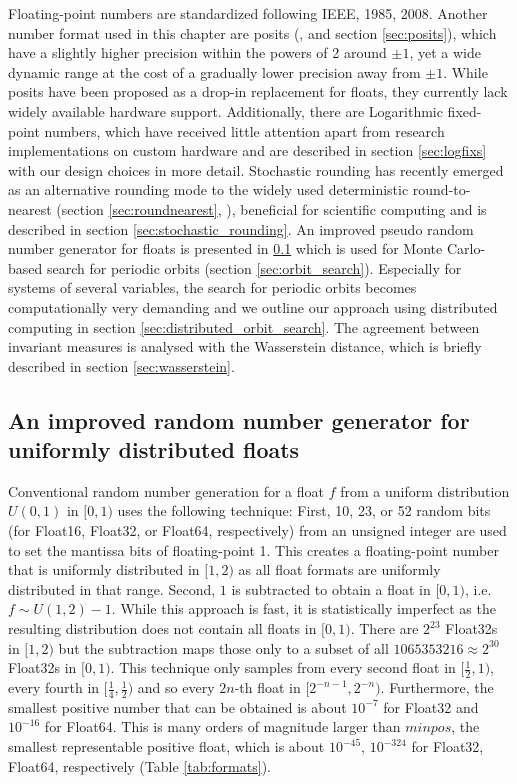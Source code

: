 Floating-point numbers are standardized following IEEE, 1985, 2008. Another number format used in this chapter are posits
(\cite{Gustafson2017a}, and section \ref{sec:posits}), which have a slightly higher precision within the powers of 2
around $\pm1$, yet a wide dynamic range at the cost of a gradually lower precision away from $\pm1$. While posits
have been proposed as a drop-in replacement for floats, they currently lack widely available hardware support.
Additionally, there are Logarithmic fixed-point numbers, which have received little attention apart from research
implementations on custom hardware \citep{Johnson2020} and are described in section \ref{sec:logfixs} with our
design choices in more detail. Stochastic rounding has recently emerged as an alternative rounding mode to the
widely used deterministic round-to-nearest (section \ref{sec:roundnearest}, \cite{IEEE1985}), beneficial for scientific computing
\citep{Croci2020,Fasi2021,Hopkins2020,Paxton2021} and is described in section \ref{sec:stochastic_rounding}.
An improved pseudo random number generator for floats is presented in \ref{sec:randfloat} which is used for Monte
Carlo-based search for periodic orbits (section \ref{sec:orbit_search}). Especially for systems of several variables,
the search for periodic orbits becomes computationally very demanding and we outline our approach using
distributed computing in section \ref{sec:distributed_orbit_search}. The agreement between invariant measures
is analysed with the Wasserstein distance, which is briefly described in section \ref{sec:wasserstein}.

\subsection{An improved random number generator for uniformly distributed floats}
\label{sec:randfloat}

Conventional random number generation for a float $f$ from a uniform distribution $U(0,1)$
in $[0,1)$ uses the following technique: First, 10, 23, or 52 random bits (for Float16, Float32, or Float64, respectively)
from an unsigned integer are used to set the mantissa bits of floating-point 1. This creates a floating-point
number that is uniformly distributed in $[1,2)$ as all float formats are uniformly distributed in that range. Second,
$1$ is subtracted to obtain a float in $[0,1)$, i.e. $f \sim U(1,2) - 1$. While this approach is fast, it is statistically
imperfect as the resulting distribution does not contain all floats in $[0,1)$. There are $2^{23}$ Float32s in $[1,2)$
but the subtraction maps those only to a subset of all $1065353216 \approx 2^{30}$ Float32s in $[0,1)$.
This technique only samples from every second float in $[\tfrac{1}{2},1)$, every fourth in
$[\tfrac{1}{4},\tfrac{1}{2})$ and so every $2n$-th float in $[2^{-n-1},2^{-n})$. Furthermore, the smallest positive
number that can be obtained is about $10^{-7}$ for Float32 and $10^{-16}$ for Float64. This is many orders of
magnitude larger than $minpos$, the smallest representable positive float, which is about $10^{-45}$, $10^{-324}$
for Float32, Float64, respectively (Table \ref{tab:formats}).

